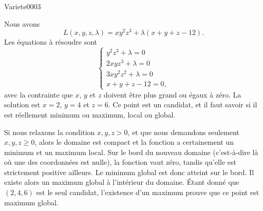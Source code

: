 
\begin{corrige}{Variete0003}

	Nous avons
	\begin{equation}
		L(x,y,z,\lambda)=xy^2z^3+\lambda(x+y+z-12).
	\end{equation}
	Les équations à résoudre sont
	\begin{equation}
		\left\{
		\begin{array}{ll}
			y^2z^3+\lambda=0\\
			2xyz^3+\lambda=0\\
			3xy^2z^2+\lambda=0\\
			x+y+z-12=0,
		\end{array}
		\right.
	\end{equation}
	avec la contrainte que $x$, $y$ et $z$ doivent être plus grand ou égaux à zéro. La solution est $x=2$, $y=4$ et $z=6$. Ce point est un candidat, et il faut savoir si il est réellement minimum ou maximum, local ou global.

	Si nous relaxons la condition $x,y,z>0$, et que nous demandons seulement $x,y,z\geq 0$, alors le domaine est compact et la fonction a certainement un minimum et un maximum local. Sur le bord du nouveau domaine (c'est-à-dire là où une des coordonnées est nulle), la fonction vaut zéro, tandis qu'elle est strictement positive ailleurs. Le minimum global est donc atteint sur le bord. Il existe alors un maximum global à l'intérieur du domaine. Étant donné que $(2,4,6)$ est le seul candidat, l'existence d'un maximum prouve que ce point est maximum global.

\end{corrige}
